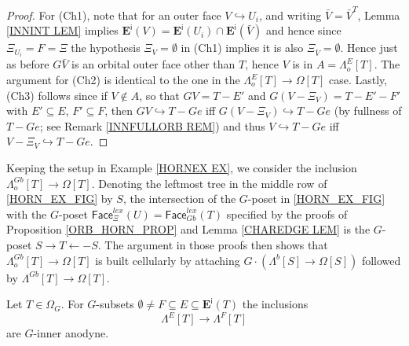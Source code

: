 \documentclass[a4paper,10pt
 ,draft
]{article}%
\begin{document}
\begin{proof}
For (Ch1), note that for an outer face 
$V \hookrightarrow U_i$, and writing $\bar{V} = \bar{V}^T$,
Lemma \ref{INNINT LEM} implies
$\boldsymbol{E}^{\mathsf{i}}(V) = 
\boldsymbol{E}^{\mathsf{i}}(U_i) \cap \boldsymbol{E}^{\mathsf{i}}(\bar{V})$
and hence since $\Xi_{U_i} = F = \Xi$ the 
hypothesis $\Xi_{V} = \emptyset$ in (Ch1) implies it is also
$\Xi_{\bar{V}} = \emptyset$.
Hence just as before $G\bar{V}$ is an orbital outer face other than $T$, hence $V$ is in $A=\Lambda_o^{E}[T]$.
The argument for (Ch2) is identical to the one in the
$\Lambda_o^{E}[T] \to \Omega[T]$ case.
Lastly, (Ch3) follows since	if $V \not \in A$, so that
$GV = T - E'$ and $G(V - \Xi_V) = T-E'-F'$ with
$E' \subseteq E$, $F' \subseteq F$,
then $GV \hookrightarrow T-Ge$ iff $G(V - \Xi_V) \hookrightarrow T-Ge$
(by fullness of $T-Ge$; see Remark \ref{INNFULLORB REM})
and thus $V \hookrightarrow T-Ge$ iff $V - \Xi_V \hookrightarrow T-Ge$.
\end{proof}


\begin{example}
Keeping the setup in Example \ref{HORNEX EX}, we consider the inclusion $\Lambda_o^{Gb}[T] \to \Omega[T]$.
Denoting the leftmost tree in the middle row of \eqref{HORN_EX_FIG} by $S$, the intersection of the 
$G$-poset in \eqref{HORN_EX_FIG} with the $G$-poset 
$\mathsf{Face}^{lex}_{\Xi}(U)=
\mathsf{Face}^{lex}_{Gb}(T)$
specified by the proofs of Proposition \ref{ORB_HORN_PROP} and Lemma \ref{CHAREDGE LEM} is the $G$-poset
$S \to T \leftarrow -S$.
The argument in those proofs then shows that $\Lambda_o^{Gb}[T] \to \Omega[T]$ is built cellularly by attaching
$G \cdot \left(\Lambda^b[S] \to \Omega[S]\right)$
followed by $\Lambda^{Gb}[T] \to \Omega[T]$.
\end{example}


\begin{proposition}\label{REG_HORN_PROP}
Let $T \in \Omega_G$.
For $G$-subsets 
$\emptyset \neq F \subseteq E \subseteq 
\boldsymbol{E}^{\mathsf{i}}(T)$
the inclusions
\begin{equation}
	\Lambda^{E}[T] \to \Lambda^{F}[T]
\end{equation}
are $G$-inner anodyne.
\end{proposition}
\end{document}
